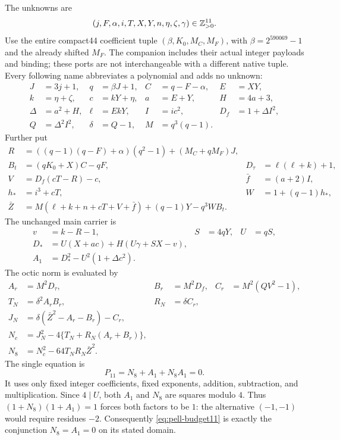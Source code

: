 The unknowns are
\[
 (j,F,\alpha,i,T,X,Y,n,\eta,\zeta,\gamma)\in\mathbb Z_{>0}^{11}.
\]
Use the entire compact44 coefficient tuple
$(\beta,K_0,M_C,M_F)$, with $\beta=2^{590069}-1$ and the already shifted
$M_F$.  The companion includes their actual integer payloads and binding;
these ports are not interchangeable with a different native tuple.
Every following name abbreviates a polynomial and adds no unknown:
\begin{align*}
 J&=3j+1,&q&=\beta J+1,&C&=q-F-\alpha,&E&=XY,\\
 k&=\eta+\zeta,&c&=kY+\eta,&a&=E+Y,&H&=4a+3,\\
 \Delta&=a^2+H,&\ell&=EkY,&I&=ic^2,&D_f&=1+\Delta I^2,\\
 Q&=\Delta^2I^2,&\delta&=Q-1,&M&=q^3(q-1).
\end{align*}
Further put
\begin{align*}
 R&=((q-1)(q-F)+\alpha)(q^2-1)+(M_C+qM_F)J,\\
 B_t&=(qK_0+X)C-qF,&D_\tau&=\ell(\ell+k)+1,\\
 V&=D_f(cT-R)-c,&\bar f&=(a+2)I,\\
 h_*&=i^3+cT,&W&=1+(q-1)h_*,\\
 \bar Z&=M(\ell+k+n+cT+V+\bar f)+(q-1)Y-q^3WB_t.
\end{align*}
The unchanged main carrier is
\begin{align*}
 v&=k-R-1,&S&=4qY,&U&=qS,\\
 D_*&=U(X+ac)+H(U\gamma+SX-v),\\
 A_1&=D_*^2-U^2(1+\Delta c^2).
\end{align*}
The octic norm is evaluated by
\begin{align*}
 A_r&=M^2D_\tau,&B_r&=M^2D_f,&C_r&=M^2(QV^2-1),\\
 T_N&=\delta^2A_rB_r,&R_N&=\delta C_r,\\
 J_N&=\delta(\bar Z^2-A_r-B_r)-C_r,\\
 N_c&=J_N^2-4\{T_N+R_N(A_r+B_r)\},\\
 N_8&=N_c^2-64T_NR_N\bar Z^2.
\end{align*}
The single equation is
\begin{equation}
 \boxed{\quad P_{11}=N_8+A_1+N_8A_1=0.\quad}
 \label{eq:pell-budget11}
\end{equation}
It uses only fixed integer coefficients, fixed exponents, addition,
subtraction, and multiplication.  Since $4\mid U$, both $A_1$ and $N_8$
are squares modulo $4$.  Thus $(1+N_8)(1+A_1)=1$ forces both factors to
be $1$: the alternative $(-1,-1)$ would require residues $-2$.
Consequently \eqref{eq:pell-budget11} is exactly the conjunction
$N_8=A_1=0$ on its stated domain.

